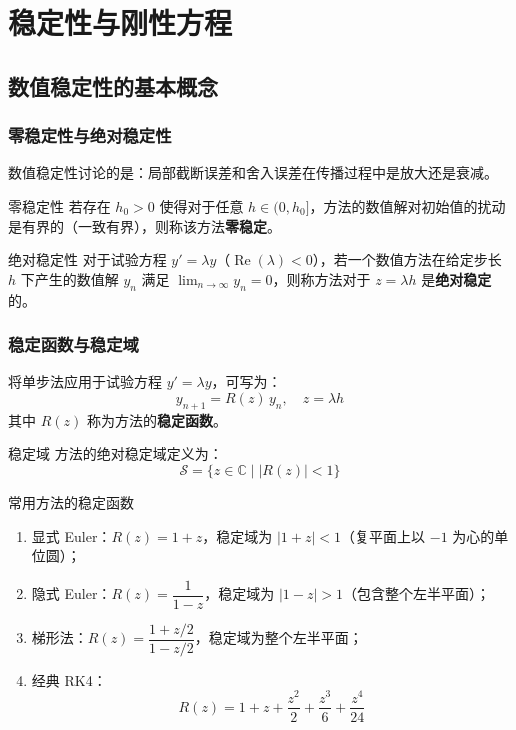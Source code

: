 \chapter{稳定性与刚性方程}


\section{数值稳定性的基本概念}

\subsection{零稳定性与绝对稳定性}

数值稳定性讨论的是：局部截断误差和舍入误差在传播过程中是放大还是衰减。

\begin{mydefinition}{零稳定性}
	若存在 $h_0 > 0$ 使得对于任意 $h \in (0, h_0]$，方法的数值解对初始值的扰动是有界的（一致有界），则称该方法\textbf{零稳定}。
\end{mydefinition}

\begin{mydefinition}{绝对稳定性}
	对于试验方程 $y' = \lambda y$（$\operatorname{Re}(\lambda) < 0$），若一个数值方法在给定步长 $h$ 下产生的数值解 $y_n$ 满足 $\lim_{n\to\infty} y_n = 0$，则称方法对于 $z = \lambda h$ 是\textbf{绝对稳定}的。
\end{mydefinition}

\subsection{稳定函数与稳定域}

将单步法应用于试验方程 $y' = \lambda y$，可写为：
\[
y_{n+1} = R(z) \, y_n, \quad z = \lambda h
\]
其中 $R(z)$ 称为方法的\textbf{稳定函数}。

\begin{mydefinition}{稳定域}
	方法的绝对稳定域定义为：
	\[
	\mathcal{S} = \{ z \in \mathbb{C} \mid |R(z)| < 1 \}
	\]
\end{mydefinition}

\begin{theorem}{常用方法的稳定函数}
	\begin{enumerate}
		\item 显式 Euler：$R(z) = 1 + z$，稳定域为 $|1+z| < 1$（复平面上以 $-1$ 为心的单位圆）；
		\item 隐式 Euler：$R(z) = \dfrac{1}{1 - z}$，稳定域为 $|1-z| > 1$（包含整个左半平面）；
		\item 梯形法：$R(z) = \dfrac{1 + z/2}{1 - z/2}$，稳定域为整个左半平面；
		\item 经典 RK4：
		\[
		R(z) = 1 + z + \frac{z^2}{2} + \frac{z^3}{6} + \frac{z^4}{24}
		\]
	\end{enumerate}
\end{theorem}

